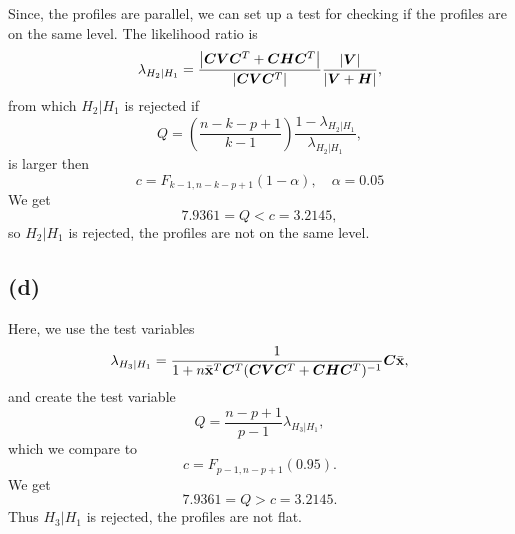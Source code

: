 Since, the profiles are parallel, we can set up a test for checking if
the profiles are on the same level. The likelihood ratio is 
\begin{equation*}
  \lambda_{H_2 | H_1} = \frac{\left| \bm{C}\bm{V} \bm{C}^{T} + \bm{C} \bm{H}\bm{C}^T \right|}{\left| \bm{C}\bm{V} \bm{C}^T \right|}\frac{\left| \bm{V} \right|}{\left| \bm{V}+\bm{H} \right|},
\end{equation*}
from which $H_{2}|H_{1}$ is rejected if 
\begin{equation*}
  Q = \left(\frac{n-k - p +1}{k - 1}\right)\frac{1 - \lambda_{H_2 |H_1}}{\lambda_{H_2 | H_1}},
\end{equation*}
is larger then 
\begin{equation*}
  c = F_{k-1, n - k - p +1} (1 - \alpha), \quad \alpha = 0.05
\end{equation*}
We get
\begin{equation*}
 7.9361  = Q < c = 3.2145,
\end{equation*}
so $H_2 | H_1$ is rejected, the profiles are not on the same level.

\subsection*{(d)}
\label{sec:d-1}

Here, we use the test variables 
\begin{equation*}
  \lambda_{H_3 | H_1} = \frac{1}{1 + n \bar{\bf x}^T \bm{C}^T (\bm{CVC}^T +
    \bm{CHC}^T)^{-1}}\bm{C}\bar{\bf x},
\end{equation*}
and create the test variable
\begin{equation*}
  Q = \frac{n - p +1}{p - 1}\lambda_{H_3 |H_1}, 
\end{equation*}
which we compare to 
\begin{equation*}
  c = F_{p-1, n-p+1}(0.95).
\end{equation*}
We get
\begin{equation*}
  7.9361 = Q > c = 3.2145.
\end{equation*}
Thus $H_3 | H_1$ is rejected, the profiles are not flat.
